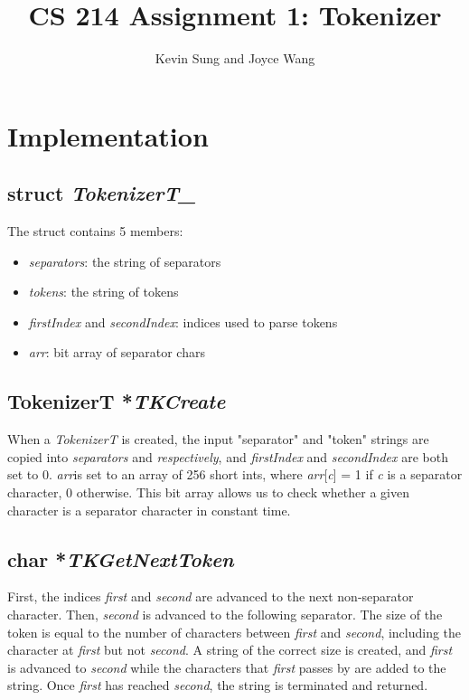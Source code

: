 \documentclass{article}
\title{CS 214 Assignment 1: Tokenizer}
\author{Kevin Sung and Joyce Wang}
\begin{document}
\maketitle

\section{Implementation}

\subsection{struct \emph{TokenizerT\_}}

The struct contains 5 members:
\begin{itemize}
    \item \emph{separators}: the string of separators
    \item \emph{tokens}: the string of tokens
    \item \emph{firstIndex} and \emph{secondIndex}: indices used to parse tokens
    \item \emph{arr}: bit array of separator chars
\end{itemize}

\subsection{TokenizerT *\emph{TKCreate}}

When a \emph{TokenizerT} is created, the input "separator" and "token" strings are
copied into \emph{separators} and \emph{respectively}, and \emph{firstIndex} and
\emph{secondIndex} are both set to 0. \emph{arr}is set to an array of 256 short ints,
where \emph{arr}[\emph{c}] = 1 if \emph{c} is a separator character, 0 otherwise.
This bit array allows us to check whether a given character is a separator character in
constant time.

\subsection{char *\emph{TKGetNextToken}}
First, the indices \emph{first} and \emph{second} are advanced to the next non-separator
character. Then, \emph{second} is advanced to the following separator. The size of the
token is equal to the number of characters between \emph{first} and \emph{second},
including the character at \emph{first} but not \emph{second}. A string of the correct
size is created, and \emph{first} is advanced to \emph{second} while the characters that
\emph{first} passes by are added to the string. Once \emph{first} has reached \emph{second},
the string is terminated and returned.
\end{document}
